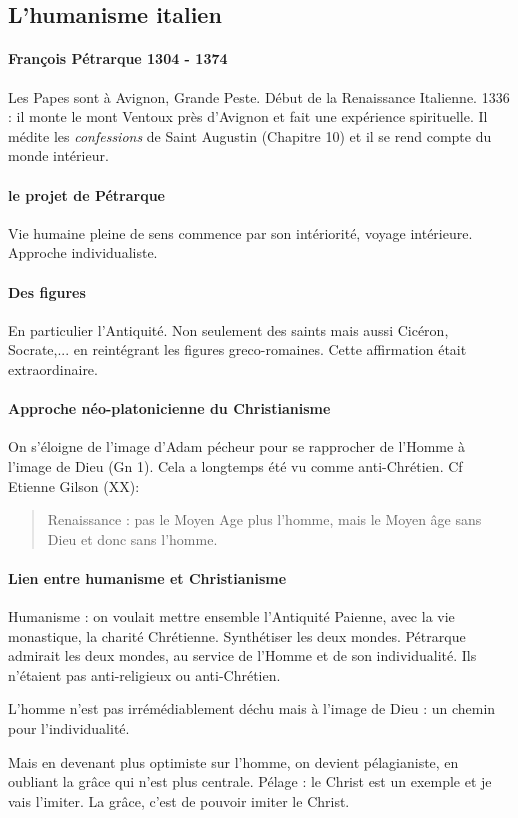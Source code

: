 \subsection{L’humanisme italien}   

\paragraph{François Pétrarque 1304 - 1374} Les Papes sont à Avignon, Grande Peste. Début de la Renaissance Italienne. 1336 : il monte le mont Ventoux près d'Avignon et fait une expérience spirituelle. Il médite les \textit{confessions} de Saint Augustin (Chapitre 10) et il se rend compte du monde intérieur.

\paragraph{le projet de Pétrarque} Vie humaine pleine de sens commence par son intériorité, voyage intérieure. Approche individualiste. 
\paragraph{Des figures } En particulier l'Antiquité. Non seulement des saints mais aussi Cicéron, Socrate,... en reintégrant les figures greco-romaines.
Cette affirmation était extraordinaire.

\paragraph{Approche néo-platonicienne du Christianisme} On s'éloigne de l'image d'Adam pécheur pour se rapprocher de l'Homme à l'image de Dieu (Gn 1).  Cela a longtemps été vu comme anti-Chrétien. Cf Etienne Gilson (XX):
\begin{quote}
    Renaissance : pas le Moyen Age plus l'homme, mais le Moyen âge sans Dieu et donc sans l'homme.
\end{quote}

\paragraph{Lien entre humanisme et Christianisme} Humanisme : on voulait mettre ensemble l'Antiquité Paienne, avec la vie monastique, la charité Chrétienne. Synthétiser les deux mondes. Pétrarque admirait les deux mondes, au service de l'Homme et de son individualité. Ils n'étaient pas anti-religieux ou anti-Chrétien. 

\begin{Synthesis}
L'homme n'est pas irrémédiablement déchu mais à l'image de Dieu : un chemin pour l'individualité.
\end{Synthesis}
Mais en devenant plus optimiste sur l'homme, on devient pélagianiste, en oubliant la grâce qui n'est plus centrale. Pélage : le Christ est un exemple et je vais l'imiter. La grâce, c'est de pouvoir imiter le Christ.

